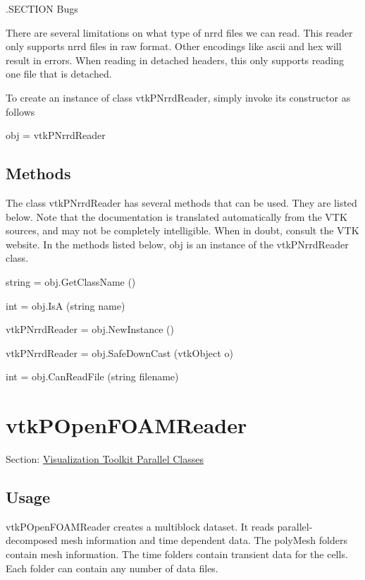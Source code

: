 .S\-E\-C\-T\-I\-O\-N Bugs

There are several limitations on what type of nrrd files we can read. This reader only supports nrrd files in raw format. Other encodings like ascii and hex will result in errors. When reading in detached headers, this only supports reading one file that is detached.

To create an instance of class vtk\-P\-Nrrd\-Reader, simply invoke its constructor as follows \begin{DoxyVerb}  obj = vtkPNrrdReader
\end{DoxyVerb}
 \hypertarget{vtkwidgets_vtkxyplotwidget_Methods}{}\subsection{Methods}\label{vtkwidgets_vtkxyplotwidget_Methods}
The class vtk\-P\-Nrrd\-Reader has several methods that can be used. They are listed below. Note that the documentation is translated automatically from the V\-T\-K sources, and may not be completely intelligible. When in doubt, consult the V\-T\-K website. In the methods listed below, {\ttfamily obj} is an instance of the vtk\-P\-Nrrd\-Reader class. 
\begin{DoxyItemize}
\item {\ttfamily string = obj.\-Get\-Class\-Name ()}  
\item {\ttfamily int = obj.\-Is\-A (string name)}  
\item {\ttfamily vtk\-P\-Nrrd\-Reader = obj.\-New\-Instance ()}  
\item {\ttfamily vtk\-P\-Nrrd\-Reader = obj.\-Safe\-Down\-Cast (vtk\-Object o)}  
\item {\ttfamily int = obj.\-Can\-Read\-File (string filename)}  
\end{DoxyItemize}\hypertarget{vtkparallel_vtkpopenfoamreader}{}\section{vtk\-P\-Open\-F\-O\-A\-M\-Reader}\label{vtkparallel_vtkpopenfoamreader}
Section\-: \hyperlink{sec_vtkparallel}{Visualization Toolkit Parallel Classes} \hypertarget{vtkwidgets_vtkxyplotwidget_Usage}{}\subsection{Usage}\label{vtkwidgets_vtkxyplotwidget_Usage}
vtk\-P\-Open\-F\-O\-A\-M\-Reader creates a multiblock dataset. It reads parallel-\/decomposed mesh information and time dependent data. The poly\-Mesh folders contain mesh information. The time folders contain transient data for the cells. Each folder can contain any number of data files.

